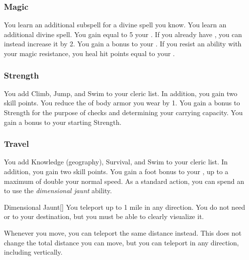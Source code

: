         \subsubsection{Magic}
             You learn an additional subspell for a divine spell you know.
             You learn an additional divine spell.
             You gain  equal to 5 \add your .
            If you already have , you can instead increase it by 2.
             You gain a  bonus to your .
            If you resist an ability with your magic resistance, you heal hit points equal to your .

        \subsubsection{Strength}
             You add Climb, Jump, and Swim to your cleric  list.
            In addition, you gain two skill points.
             You reduce the  of body armor you wear by 1.
             You gain a  bonus to Strength for the purpose of checks and determining your carrying capacity.
             You gain a  bonus to your starting Strength.

        \subsubsection{Travel}
             You add Knowledge (geography), Survival, and Swim to your cleric  list.
            In addition, you gain two skill points.
             You gain a  foot bonus to your , up to a maximum of double your normal speed.
             As a standard action, you can spend an  to use the \textit{dimensional jaunt} ability.
            \begin{ability}{Dimensional Jaunt}[]
                You teleport up to 1 mile in any direction.
                You do not need  or  to your destination, but you must be able to clearly visualize it.
            \end{ability}
             Whenever you move, you can teleport the same distance instead.
            This does not change the total distance you can move, but you can teleport in any direction, including vertically.


